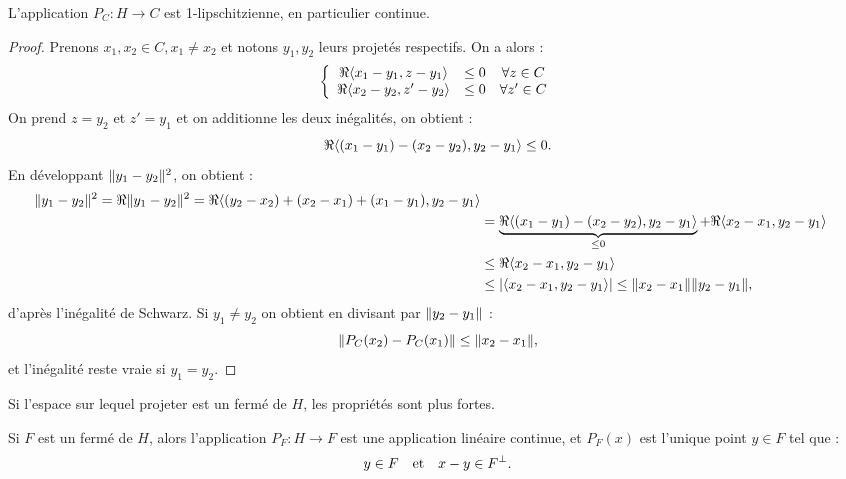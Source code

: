 \begin{prop}
L'application $P_C : H \to C$ est 1-lipschitzienne, en particulier continue.
\end{prop}

\begin{proof}
Prenons $x_1, x_2 \in C, x_1 \neq x_2$ et notons $y_1, y_2$ leurs projetés respectifs. On a alors :
\[ \left \{ \begin{array}{c c c}
\Re{\langle x_1-y_1, z-y_1\rangle} & \leq 0 & \forall z \in C \\
\Re{\langle x_2-y_2, z'-y_2\rangle} & \leq 0 & \forall z' \in C
\end{array} \right. \]
On prend $z=y_2$ et $z'=y_1$ et on additionne les deux inégalités, on obtient :
\[ \Re{\langle(x_1-y_1)-(x_2-y_2),y_2-y_1\rangle} \leq 0 . \]
En développant $\lVert y_1-y_2\rVert^2$, on obtient :
\begin{align*}
\lVert y_1-y_2\rVert^2 = \Re{\lVert y_1-y_2\rVert^2} = \Re{\langle(y_2-x_2)+(x_2-x_1)+(x_1-y_1),y_2-y_1\rangle} \\
& = \underbrace{\Re{\langle(x_1-y_1)-(x_2-y_2),y_2-y_1\rangle}}_{\leq 0} + \Re{\langle x_2-x_1,y_2-y_1\rangle} \\
& \leq \Re{\langle x_2-x_1,y_2-y_1\rangle} \\
& \leq \lvert\langle x_2-x_1,y_2-y_1\rangle\rvert \leq \lVert x_2-x_1\rVert \lVert y_2-y_1\rVert ,
\end{align*}
d'après l'inégalité de Schwarz. Si $y_1 \neq y_2$ on obtient en divisant par $\lVert y_2-y_1\rVert$ :
\[ \lVert P_C(x_2)-P_C(x_1)\rVert \leq \lVert x_2 - x_1\rVert , \]
et l'inégalité reste vraie si $y_1=y_2$.
\end{proof}

\begin{rmq}
Si l'espace sur lequel projeter est un \sev fermé de $H$, les propriétés sont plus fortes.
\end{rmq}

\begin{thm}
Si $F$ est un \sev fermé de $H$, alors l'application $P_F :H \to F$ est une application linéaire continue,
et $P_F(x)$ est l'unique point $y \in F$ tel que :
\[ y \in F \quad \text{et} \quad x-y \in F^{\perp} . \]
\end{thm}

